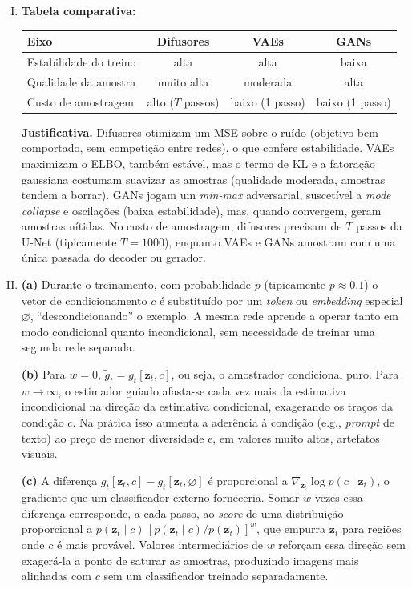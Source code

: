 \documentclass{dlproblemset}
\begin{document}
\begin{enumerate}[I)]
    \item \textbf{Tabela comparativa:}
    \begin{center}
    \begin{tabular}{lccc}
      \toprule
      Eixo & Difusores & VAEs & GANs \\
      \midrule
      Estabilidade do treino & alta & alta & baixa \\
      Qualidade da amostra & muito alta & moderada & alta \\
      Custo de amostragem & alto ($T$ passos) & baixo (1 passo) & baixo (1 passo) \\
      \bottomrule
    \end{tabular}
    \end{center}

    \textbf{Justificativa.} Difusores otimizam um MSE sobre o ruído (objetivo bem comportado, sem competição entre redes), o que confere estabilidade. VAEs maximizam o ELBO, também estável, mas o termo de KL e a fatoração gaussiana costumam suavizar as amostras (qualidade moderada, amostras tendem a borrar). GANs jogam um \textit{min-max} adversarial, suscetível a \textit{mode collapse} e oscilações (baixa estabilidade), mas, quando convergem, geram amostras nítidas. No custo de amostragem, difusores precisam de $T$ passos da U-Net (tipicamente $T = 1000$), enquanto VAEs e GANs amostram com uma única passada do decoder ou gerador.

    \item \textbf{(a)} Durante o treinamento, com probabilidade $p$ (tipicamente $p \approx 0.1$) o vetor de condicionamento $c$ é substituído por um \textit{token} ou \textit{embedding} especial $\varnothing$, ``descondicionando'' o exemplo. A mesma rede aprende a operar tanto em modo condicional quanto incondicional, sem necessidade de treinar uma segunda rede separada.

    \textbf{(b)} Para $w = 0$, $\tilde{g}_t = g_t[\mathbf{z}_t, c]$, ou seja, o amostrador condicional puro. Para $w \to \infty$, o estimador guiado afasta-se cada vez mais da estimativa incondicional na direção da estimativa condicional, exagerando os traços da condição $c$. Na prática isso aumenta a aderência à condição (e.g., \textit{prompt} de texto) ao preço de menor diversidade e, em valores muito altos, artefatos visuais.

    \textbf{(c)} A diferença $g_t[\mathbf{z}_t, c] - g_t[\mathbf{z}_t, \varnothing]$ é proporcional a $\nabla_{\mathbf{z}_t}\log p(c \mid \mathbf{z}_t)$, o gradiente que um classificador externo forneceria. Somar $w$ vezes essa diferença corresponde, a cada passo, ao \textit{score} de uma distribuição proporcional a $p(\mathbf{z}_t \mid c)\,[p(\mathbf{z}_t \mid c)/p(\mathbf{z}_t)]^{w}$, que empurra $\mathbf{z}_t$ para regiões onde $c$ é mais provável. Valores intermediários de $w$ reforçam essa direção sem exagerá-la a ponto de saturar as amostras, produzindo imagens mais alinhadas com $c$ sem um classificador treinado separadamente.


\end{enumerate}
\end{document}
